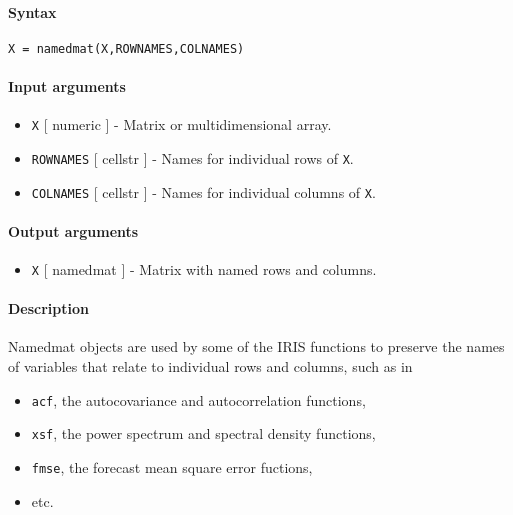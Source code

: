 


	\paragraph{Syntax}\label{syntax}

\begin{verbatim}
X = namedmat(X,ROWNAMES,COLNAMES)
\end{verbatim}

\paragraph{Input arguments}\label{input-arguments}

\begin{itemize}
\item
  \texttt{X} {[} numeric {]} - Matrix or multidimensional array.
\item
  \texttt{ROWNAMES} {[} cellstr {]} - Names for individual rows of
  \texttt{X}.
\item
  \texttt{COLNAMES} {[} cellstr {]} - Names for individual columns of
  \texttt{X}.
\end{itemize}

\paragraph{Output arguments}\label{output-arguments}

\begin{itemize}
\itemsep1pt\parskip0pt
\item
  \texttt{X} {[} namedmat {]} - Matrix with named rows and columns.
\end{itemize}

\paragraph{Description}\label{description}

Namedmat objects are used by some of the IRIS functions to preserve the
names of variables that relate to individual rows and columns, such as
in

\begin{itemize}
\itemsep1pt\parskip0pt
\item
  \texttt{acf}, the autocovariance and autocorrelation functions,
\item
  \texttt{xsf}, the power spectrum and spectral density functions,
\item
  \texttt{fmse}, the forecast mean square error fuctions,
\item
  etc.
\end{itemize}

